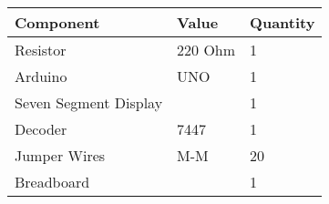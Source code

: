 \begin{tabular}{|p{5cm}|p{3cm}|p{2cm}|}
	\hline
	Component& Value& Quantity\\
	\hline
	Resistor &220 Ohm& 1\\
	\hline
	Arduino& UNO& 1\\
	\hline
	Seven Segment Display&  & 1\\              
	\hline                                     
	Decoder& 7447& 1\\                         
	\hline                                    
	Jumper Wires& M-M& 20\\                  
	\hline                                    
	Breadboard&  & 1\\                         
	\hline                                     
\end{tabular}
